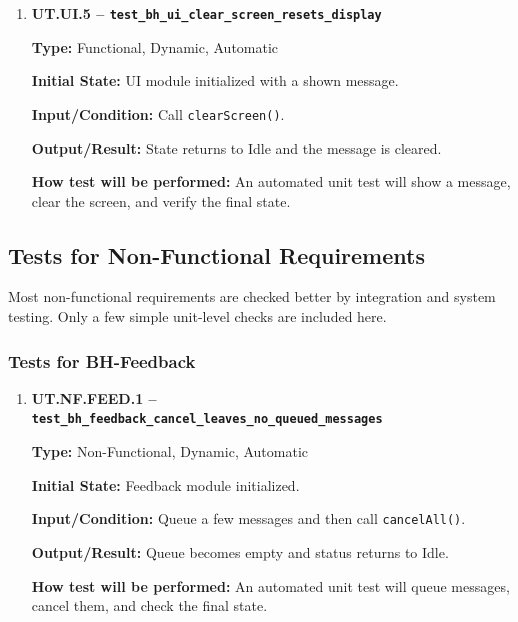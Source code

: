 \documentclass[12pt, titlepage]{article}
\begin{document}
\begin{enumerate}
\textbf{Output/Result:} The prompt path returns the expected user response.

\textbf{How test will be performed:} An automated unit test will mock the user
response and verify the returned value.

\item \textbf{UT.UI.5 --
\texttt{test\_bh\_ui\_clear\_screen\_resets\_display}}

\textbf{Type:} Functional, Dynamic, Automatic

\textbf{Initial State:} UI module initialized with a shown message.

\textbf{Input/Condition:} Call \texttt{clearScreen()}.

\textbf{Output/Result:} State returns to Idle and the message is cleared.

\textbf{How test will be performed:} An automated unit test will show a
message, clear the screen, and verify the final state.

\end{enumerate}

\subsection{Tests for Non-Functional Requirements}

Most non-functional requirements are checked better by integration and
system testing. Only a few simple unit-level checks are included here.

\subsubsection{Tests for BH-Feedback}

\begin{enumerate}

\item \textbf{UT.NF.FEED.1 --
\texttt{test\_bh\_feedback\_cancel\_leaves\_no\_queued\_messages}}

\textbf{Type:} Non-Functional, Dynamic, Automatic

\textbf{Initial State:} Feedback module initialized.

\textbf{Input/Condition:} Queue a few messages and then call
\texttt{cancelAll()}.

\textbf{Output/Result:} Queue becomes empty and status returns to Idle.

\textbf{How test will be performed:} An automated unit test will queue
messages, cancel them, and check the final state.

\end{enumerate}
\end{document}
